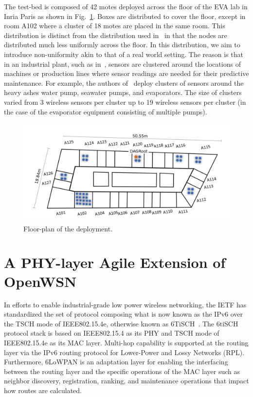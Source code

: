 \documentclass[sensors,article,submit,moreauthors,pdftex]{Definitions/mdpi}
\begin{document}

The test-bed is composed of 42 motes deployed across the floor of the EVA lab in Inria Paris as shown in Fig.~\ref{fig:building_motes}.
Boxes are distributed to cover the floor, except in room A102 where a cluster of 18 motes are placed in the same room.
This distribution is distinct from the distribution used in~\cite{brachmann19ieee} in that the nodes are distributed much less uniformly across the floor. 
In this distribution, we aim to introduce non-uniformity akin to that of a real world setting.
The reason is that in an industrial plant, such as in~\cite{civerchia17industrial}, sensors are clustered around the locations of machines or production lines where sensor readings are needed for their predictive maintenance.
For example, the authors of~\cite{civerchia17industrial} deploy clusters of sensors around the heavy ashes water pump, seawater pumps, and evaporators. 
The size of clusters varied from 3 wireless sensors per cluster up to 19 wireless sensors per cluster (in the case of the evaporator equipment consisting of multiple pumps). 

\begin{figure}
	\centering
	\includegraphics[width=0.85\columnwidth]{building_motes}
	\caption{Floor-plan of the deployment.}
    \label{fig:building_motes}
\end{figure}

\section{A PHY-layer Agile Extension of OpenWSN}
\label{sec:openwsn}


In efforts to enable industrial-grade low power wireless networking, the IETF has standardized the set of protocol composing what is now known as the IPv6 over the TSCH mode of IEEE802.15.4e, otherwise known as 6TiSCH~\cite{vilajosana19ietf}.
The 6tiSCH protocol stack is based on IEEE802.15.4 as its PHY and TSCH mode of IEEE802.15.4e as its MAC layer.
Multi-hop capability is supported at the routing layer via the IPv6 routing protocol for Lower-Power and Lossy Networks (RPL). 
Furthermore, 6LoWPAN is an adaptation layer for enabling the interfacing between the routing layer and the specific operations of the MAC layer such as neighbor discovery, registration, ranking, and maintenance operations that impact how routes are calculated. 
\end{document}
